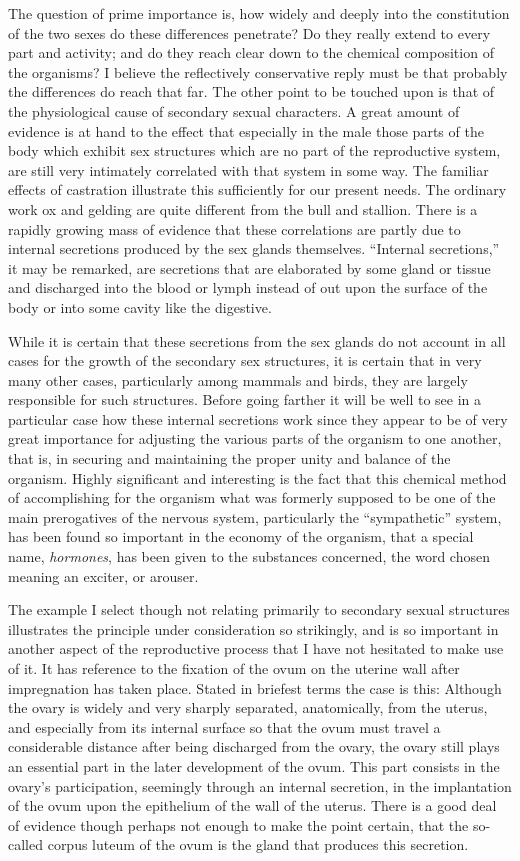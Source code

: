 \documentclass[a4paper, 11pt, oneside, polutonikogreek, english, landscape]{article}
\begin{document}
The question of prime importance is, how widely and deeply into the constitution of the two sexes do these differences penetrate? Do they really extend to every part and activity; and do they reach clear down to the chemical composition of the organisms? I believe the reflectively conservative reply must be that probably the differences do reach that far. The other point to be touched upon is that of the physiological cause of secondary sexual characters. A great amount of evidence is at hand to the effect that especially in the male those parts of the body which exhibit sex structures which are no part of the reproductive system, are still very intimately correlated with that system in some way. The familiar effects of castration illustrate this sufficiently for our present needs. The ordinary work ox and gelding are quite different from the bull and stallion. There is a rapidly growing mass of evidence that these correlations are partly due to internal secretions produced by the sex glands themselves. ``Internal secretions,'' it may be remarked, are secretions that are elaborated by some gland or tissue and discharged into the blood or lymph instead of out upon the surface of the body or into some cavity like the digestive.

While it is certain that these secretions from the sex glands do not account in all cases for the growth of the secondary sex structures, it is certain that in very many other cases, particularly among mammals and birds, they are largely responsible for such structures. Before going farther it will be well to see in a particular case how these internal secretions work since they appear to be of very great importance for adjusting the various parts of the organism to one another, that is, in securing and maintaining the proper unity and balance of the organism. Highly significant and interesting is the fact that this chemical method of accomplishing for the organism what was formerly supposed to be one of the main prerogatives of the nervous system, particularly the ``sympathetic'' system, has been found so important in the economy of the organism, that a special name, \emph{hormones}, has been given to the substances concerned, the word chosen meaning an exciter, or arouser.

The example I select though not relating primarily to secondary sexual structures illustrates the principle under consideration so strikingly, and is so important in another aspect of the reproductive process that I have not hesitated to make use of it. It has reference to the fixation of the ovum on the uterine wall after impregnation has taken place. Stated in briefest terms the case is this: Although the ovary is widely and very sharply separated, anatomically, from the uterus, and especially from its internal surface so that the ovum must travel a considerable distance after being discharged from the ovary, the ovary still plays an essential part in the later development of the ovum. This part consists in the ovary's participation, seemingly through an internal secretion, in the implantation of the ovum upon the epithelium of the wall of the uterus. There is a good deal of evidence though perhaps not enough to make the point certain, that the so-called corpus luteum of the ovum is the gland that produces this secretion.
\end{document}
